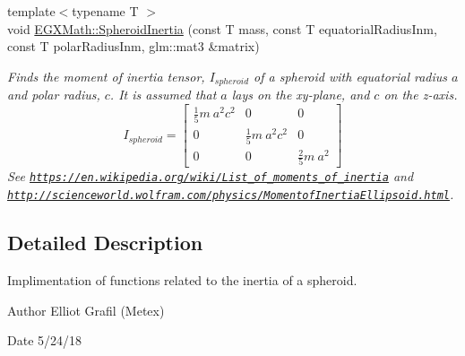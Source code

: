 \begin{DoxyCompactItemize}
{\footnotesize template$<$typename T $>$ }\\void \mbox{\hyperlink{group___e_g_x_math-_geometry-3_d-_spheroid-_inertia_ga0d621d59c21aeddf2ed5e9050aa2eeb8}{E\+G\+X\+Math\+::\+Spheroid\+Inertia}} (const T mass, const T equatorial\+Radius\+Inm, const T polar\+Radius\+Inm, glm\+::mat3 \&matrix)
\begin{DoxyCompactList}\small\item\em Finds the moment of inertia tensor, $I_{spheroid}$ of a spheroid with equatorial radius $a$ and polar radius, $c$. It is assumed that $a$ lays on the xy-\/plane, and $c$ on the z-\/axis. \[ I_{spheroid}=\begin{bmatrix} \frac{1}{5}m\ a^2c^2 & 0 & 0\\ 0 & \frac{1}{5}m\ a^2c^2 & 0\\ 0 & 0 & \frac{2}{5}m\ a^2 \end{bmatrix} \] See \href{https://en.wikipedia.org/wiki/List_of_moments_of_inertia}{\tt https\+://en.\+wikipedia.\+org/wiki/\+List\+\_\+of\+\_\+moments\+\_\+of\+\_\+inertia} and \href{http://scienceworld.wolfram.com/physics/MomentofInertiaEllipsoid.html}{\tt http\+://scienceworld.\+wolfram.\+com/physics/\+Momentof\+Inertia\+Ellipsoid.\+html}. \end{DoxyCompactList}\end{DoxyCompactItemize}


\subsection{Detailed Description}
Implimentation of functions related to the inertia of a spheroid. 

\begin{DoxyAuthor}{Author}
Elliot Grafil (Metex) 
\end{DoxyAuthor}
\begin{DoxyDate}{Date}
5/24/18 
\end{DoxyDate}
